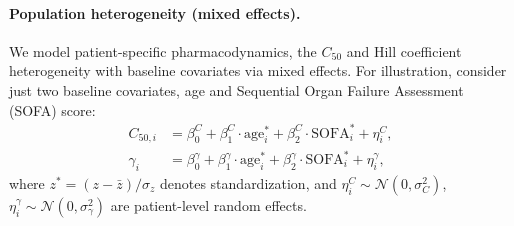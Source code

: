 \paragraph{Population heterogeneity (mixed effects).}
We model patient-specific pharmacodynamics, the $C_{50}$ and Hill coefficient heterogeneity with baseline covariates via mixed effects. For illustration, consider just two baseline covariates, age and Sequential Organ Failure Assessment (SOFA) score:
\begin{align}
C_{50,i} &= \beta^C_0 + \beta^C_1 \cdot \mathrm{age}_i^* + \beta^C_2 \cdot \mathrm{SOFA}_i^* + \eta^C_i, \\
\gamma_i &= \beta^\gamma_0 + \beta^\gamma_1 \cdot \mathrm{age}_i^* + \beta^\gamma_2 \cdot \mathrm{SOFA}_i^* + \eta^\gamma_i,
\end{align}
where $z^* = (z - \bar z)/\sigma_z$ denotes standardization, and $\eta^C_i \sim \mathcal{N}(0,\sigma_C^2)$, $\eta^\gamma_i \sim \mathcal{N}(0,\sigma_\gamma^2)$ are patient-level random effects.

